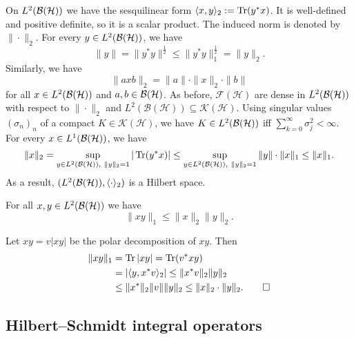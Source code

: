   On $L^2 (\operatorname{\mathcal{B} (\mathcal{H})})$ we have the sesquilinear form $\langle x, y\rangle_2 := \operatorname{Tr} (y^* x)$.
  It is well-defined and positive definite, so it is a scalar product. The induced norm is denoted by $\| \cdot \|_2$.
  For every $y \in L^2 (\operatorname{\mathcal{B} (\mathcal{H})})$, we have 
  $$\| y\| = \| y^* y\|^{\frac{1}{2}} \leq \| y^* y\|_1 ^{\frac{1}{2}} = \|y\|_2.$$
  Similarly, we have $$\| axb\|_2 = \| a\| \cdot \|x\|_2 \cdot \| b\|$$ for all $x \in L^2 (\operatorname{\mathcal{B} (\mathcal{H})})$
  and $a, b \in \operatorname{\mathcal{B} (\mathcal{H})}$. As before, $\mathcal{F} (\mathcal{H})$ are dense in $L^2 (\operatorname{\mathcal{B} (\mathcal{H})})$ with respect to $\| \cdot \|_2$ and $L^2 (\mathcal{B}(\mathcal{H})) \subseteq \mathcal{K} (\mathcal{H})$.
  Using singular values $(\sigma_n)_n$ of a compact $K \in \mathcal{K} (\mathcal{H})$, we have $K \in L^2 (\operatorname{\mathcal{B} (\mathcal{H})})$
  iff $\sum_{k = 0} ^\infty \sigma_j ^2 < \infty$.
  For every $x \in L^1 (\operatorname{\mathcal{B} (\mathcal{H})})$, we have 
  $$\| x\|_2 = \sup_{y \in L^2 (\mathcal{B}(\mathcal{H})),\ \| y\|_2 = 1} | \operatorname{Tr} (y^* x) | \leq \sup_{y \in L^2 (\operatorname{\mathcal{B} (\mathcal{H})}),\ \| y\|_2 = 1} \|y\| \cdot \| x\|_1 \leq \|x\|_1.$$
  As a result, $(L^2 (\operatorname{\mathcal{B} (\mathcal{H})}), \langle \cdot \rangle_2)$ is a Hilbert space.

\begin{theorem}
  For all $x, y \in L^2 (\operatorname{\mathcal{B} (\mathcal{H})})$ we have 
  $$\| xy\|_1 \leq \| x\|_2 \| y\|_2.$$
\end{theorem}

\begin{myproof}
  Let $xy = v|xy|$ be the polar decomposition of $xy$. Then 
  \begin{align*}
    \| xy\|_1 &= \operatorname{Tr} |xy| = \operatorname{Tr} (v^* xy)\\
    &= |\langle y, x^* v \rangle_2| \leq \| x^* v\|_2 \| y\|_2\\
    &\leq \| x^*\|_2 \| v\| \|y\|_2 \leq \| x\|_2 \cdot \|y\|_2. \qedhere
  \end{align*}
\end{myproof}

\subsection{Hilbert--Schmidt integral operators}

